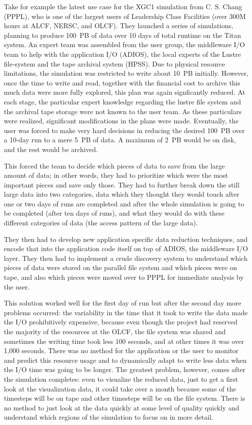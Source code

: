 Take for example the latest use case for the XGC1 simulation from C. S. Chang (PPPL), who is one of the largest users of Leadership Class Facilities (over 300M hours at ALCF, NERSC, and OLCF). They launched a series of simulations, planning to produce 100~PB of data over 10 days of total runtime on the Titan system. An expert team was assembled from the user group, the middleware I/O team to help with the application I/O (ADIOS), the local experts of the Lustre file-system and the tape archival system (HPSS). Due to physical resource limitations, the simulation was restricted to write about 10~PB initially. However, once the time to write and read, together with the financial cost to archive this much data were more fully explored, this plan was again signficantly reduced. At each stage, the particular expert knowledge regarding the lustre file system and the archival tape storage were not known to the user team. As these particulars were realized, significant modifications in the plans were made. Eventually, the user was forced to make very hard decisions in reducing the desired 100~PB over a 10-day run to a mere 5~PB of data. A maximum of 2~PB would be on disk, and the rest would be archived.

This forced the team to decide which pieces of data to save from the large amount of data; in 
other words, they had to prioritize which were the most important pieces and save only those. They had to further break down the still large data into two categories, data which they thought they would touch after one or two days of runs are completed and after the whole simulation is going to be completed (after ten days of runs), and what they would do with these different categories of data (the access pattern of the large data). 

They then had to develop new application specific data reduction techniques, and encode that into the application code itself on top of ADIOS, the middleware I/O layer. They then had to implement a crude discovery system to understand
which pieces of data were stored on the parallel file system and which pieces were on tape, and also which pieces were moved over to PPPL for immediate analysis by the user.

This solution worked well for the first day of run but after the second day more problems occurred: the variability in the time that it took to write the data made the I/O prohibitively expensive, because even though the project had reserved the majority of the resources at the OLCF, the file system was shared and sometimes the writing time took less 100 seconds, and at other times it was over 1,000 seconds. There was no method for the application or the user to monitor and predict this resource usage and to dynamically adapt to write less data when the I/O time was going to be longer. The greatest problem, however, comes after the simulation   completes: even to visualize the reduced data, just to get a first look at the visualization data, it could take over a month because some of the timesteps will be on tape and other timesteps will be on the file system. There is no method to just look at the data quickly at some level of quality quickly and understand which regions of the simulation to focus on in more detail.

